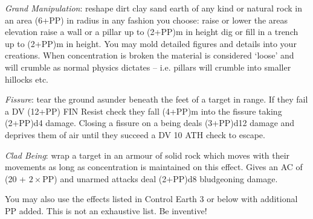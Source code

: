 \begin{multicols}{3}
{\begin{spellitemize}
\item {\it Grand Manipulation}: reshape dirt\comma{} clay\comma{} sand\comma{} earth of any kind\comma{} or natural rock in an area (6+PP) in radius in any fashion you choose: raise or lower the area\apos{}s elevation\comma{} raise a wall or a pillar up to (2+PP)m in height\comma{} dig or fill in a trench up to (2+PP)m in height. You may mold detailed figures and details into your creations. When concentration is broken\comma{} the material is considered `loose’\comma{} and will crumble as normal physics dictates – i.e. pillars will crumble into smaller hillocks etc. 
\item {\it Fissure}: tear the ground asunder beneath the feet of a target in range. If they fail a DV (12+PP) FIN Resist check\comma{} they fall (4+PP)m into the fissure\comma{} taking (2+PP)d4 damage. Closing a fissure on a being deals (3+PP)d12 damage and deprives them of air until they succeed a DV 10 ATH check to escape.
\item {\it Clad Being}: wrap a target in an armour of solid rock\comma{} which moves with their movements as long as concentration is maintained on this effect. Gives an AC of (20 + $2\times$PP)\comma{} and unarmed attacks deal (2+PP)d8 bludgeoning damage. 
\end{spellitemize}
You may also use the effects listed in Control Earth 3 or below with \PPDifference{\DVExpF}{\DVAdpF} additional PP added. 
This is not an exhaustive list. Be inventive!}
\end{multicols}
